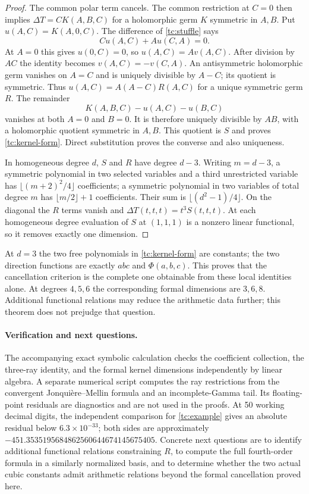 \begin{proof}
The common polar term cancels.  The common restriction at $C=0$
then implies $\Delta T=C K(A,B,C)$ for a holomorphic germ $K$
symmetric in $A,B$.  Put $u(A,C)=K(A,0,C)$.  The difference of
\eqref{tc:stuffle} says
\[
 C u(A,C)+A u(C,A)=0.
\]
At $A=0$ this gives $u(0,C)=0$, so $u(A,C)=A v(A,C)$.
After division by $AC$ the identity becomes
$v(A,C)=-v(C,A)$.  An antisymmetric holomorphic germ vanishes on
$A=C$ and is uniquely divisible by $A-C$; its quotient is symmetric.
Thus $u(A,C)=A(A-C)R(A,C)$ for a unique symmetric germ $R$.
The remainder
\[
 K(A,B,C)-u(A,C)-u(B,C)
\]
vanishes at both $A=0$ and $B=0$.  It is therefore uniquely divisible
by $AB$, with a holomorphic quotient symmetric in $A,B$.  This
quotient is $S$ and proves \eqref{tc:kernel-form}.  Direct substitution
proves the converse and also uniqueness.

In homogeneous degree $d$, $S$ and $R$ have degree $d-3$.
Writing $m=d-3$, a symmetric polynomial in two selected variables
and a third unrestricted variable has
$\lfloor(m+2)^2/4\rfloor$ coefficients; a symmetric polynomial in
two variables of total degree $m$ has $\lfloor m/2\rfloor+1$
coefficients.  Their sum is $\lfloor(d^2-1)/4\rfloor$.
On the diagonal the $R$ terms vanish and
$\Delta T(t,t,t)=t^3S(t,t,t)$.  At each homogeneous degree evaluation
of $S$ at $(1,1,1)$ is a nonzero linear functional, so it removes
exactly one dimension.
\end{proof}

At $d=3$ the two free polynomials in \eqref{tc:kernel-form} are
constants; the two direction functions are exactly $abc$ and
$\Phi(a,b,c)$.  This proves that the cancellation criterion is the
complete one obtainable from these local identities alone.  At
degrees $4,5,6$ the corresponding formal dimensions are $3,6,8$.
Additional functional relations may reduce the arithmetic data
further; this theorem does not prejudge that question.

\paragraph{Verification and next questions.}
The accompanying exact symbolic calculation checks the coefficient
collection, the three-ray identity, and the formal kernel dimensions
independently by linear algebra.  A separate numerical script computes
the ray restrictions from the convergent Jonqui\`ere--Mellin formula
and an incomplete-Gamma tail.  Its floating-point residuals are
diagnostics and are not used in the proofs.  At 50 working decimal
digits, the independent comparison for \eqref{tc:example} gives
an absolute residual below $6.3\times10^{-33}$; both sides are
approximately $-451.3535195684862560644674145675405$.
Concrete next questions
are to identify additional functional relations constraining $R$,
to compute the full fourth-order formula in a similarly normalized
basis, and to determine whether the two actual cubic constants admit
arithmetic relations beyond the formal cancellation proved here.
